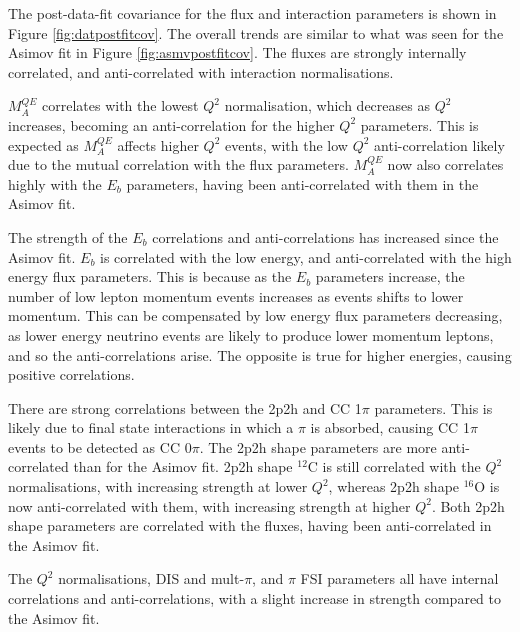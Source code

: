 The post-data-fit covariance for the flux and interaction parameters is shown in Figure \ref{fig:datpostfitcov}. The overall trends are similar to what was seen for the Asimov fit in Figure \ref{fig:asmvpostfitcov}. The fluxes are strongly internally correlated, and anti-correlated with interaction normalisations. 

$M^{QE}_A$ correlates with the lowest $Q^2$ normalisation, which decreases as $Q^2$ increases, becoming an anti-correlation for the higher $Q^2$ parameters. This is expected as $M^{QE}_A$ affects higher $Q^2$ events, with the low $Q^2$ anti-correlation likely due to the mutual correlation with the flux parameters. $M^{QE}_A$ now also correlates highly with the $E_b$ parameters, having been anti-correlated with them in the Asimov fit.

The strength of the $E_b$ correlations and anti-correlations has increased since the Asimov fit. $E_b$ is correlated with the low energy, and anti-correlated with the high energy flux parameters. This is because as the $E_b$ parameters increase, the number of low lepton momentum events increases as events shifts to lower momentum. This can be compensated by low energy flux parameters decreasing, as lower energy neutrino events are likely to produce lower momentum leptons, and so the anti-correlations arise. The opposite is true for higher energies, causing positive correlations.

There are strong correlations between the 2p2h and CC 1$\pi$ parameters. This is likely due to final state interactions in which a $\pi$ is absorbed, causing CC 1$\pi$ events to be detected as CC 0$\pi$. The 2p2h shape parameters are more anti-correlated than for the Asimov fit. 2p2h shape $^{12}$C is still correlated with the $Q^2$ normalisations, with increasing strength at lower $Q^2$, whereas 2p2h shape $^{16}$O is now anti-correlated with them, with increasing strength at higher $Q^2$. Both 2p2h shape parameters are correlated with the fluxes, having been anti-correlated in the Asimov fit.

The $Q^2$ normalisations, DIS and mult-$\pi$, and $\pi$ FSI parameters all have internal correlations and anti-correlations, with a slight increase in strength compared to the Asimov fit. 

